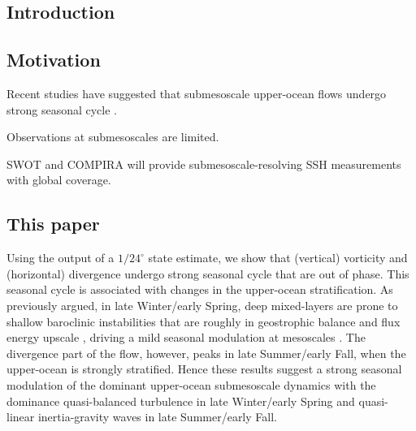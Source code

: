 \documentclass[grl]{agutex2015}
\begin{document}
\begin{article}

%
%

\section{Introduction}

\subsection{Motivation}
Recent studies have suggested that submesoscale upper-ocean flows
undergo strong seasonal cycle \citep{sasaki_etal2014,qiu_etal2014,
callies_etal2015, thompson_etal2016,buckingham_etal2016}.

Observations at submesoscales are limited.

SWOT and COMPIRA will provide submesoscale-resolving SSH measurements
with global coverage.



\subsection{This paper}
Using the output of a $1/24^\circ$ state estimate, we show that (vertical)
vorticity and (horizontal) divergence undergo strong seasonal cycle that are
out of phase. This seasonal cycle is associated with changes in the upper-ocean
stratification. As previously argued, in late Winter/early Spring,
deep mixed-layers are prone to
shallow baroclinic instabilities that are roughly in geostrophic balance
and flux energy upscale \citep{sasaki_etal2014,callies_etal2016},
driving a mild seasonal modulation at mesoscales \citep{sasaki_etal2014,qiu_etal2014}.
The divergence part of the flow, however, peaks in late Summer/early Fall,
when the upper-ocean is strongly stratified. Hence these results suggest a
strong seasonal modulation of the dominant upper-ocean submesoscale dynamics
with the dominance quasi-balanced turbulence in late Winter/early Spring and
quasi-linear inertia-gravity waves in late Summer/early Fall.


\end{article}
\end{document}
